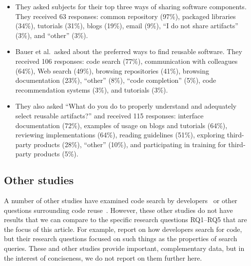 \documentclass[review]{elsarticle}
\begin{document}
\begin{itemize}

\item They asked subjects for their top three ways of sharing software components.  They received 63 responses: common repository (97\%), packaged libraries (34\%), tutorials (31\%), blogs (19\%), email (9\%), ``I do not share artifacts'' (3\%), and ``other'' (3\%).

\item Bauer et al.\ asked about the preferred ways to find reusable software.  They received 106 responses: code search (77\%), communication with colleagues (64\%), Web search (49\%), browsing repositories (41\%), browsing documentation (23\%), ``other'' (8\%), ``code completion'' (5\%), code recommendation systems (3\%), and tutorials (3\%).

\item They also asked ``What do you do to properly understand and adequately select reusable artifacts?'' and received 115 responses: interface documentation (72\%), examples of usage on blogs and tutorials (64\%), reviewing implementations (64\%), reading guidelines (51\%), exploring third-party products (28\%), ``other'' (10\%), and participating in training for third-party products (5\%).

\end{itemize}



\subsection{Other studies}

A number of other studies have examined code search by developers~\citep[e.g.,][]{sim2012software, gallardo2011kinds, singer1997examination, sadowski2015developers} or other questions surrounding code reuse~\cite[e.g.,][]{sojer2010code, frakes1995sixteen, morisio2002success}.  However, these other studies do not have results that we can compare to the specific research questions RQ1--RQ5 that are the focus of this article.  For example, \citet{sadowski2015developers} report on how developers search for code, but their research questions focused on such things as the properties of search queries.  These and other studies provide important, complementary data, but in the interest of conciseness, we do not report on them further here.
\end{document}
